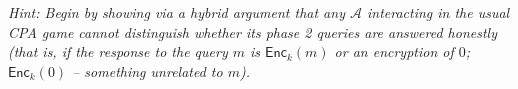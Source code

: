 \documentclass[11pt]{article}
\newcommand{\Enc}{\mathsf{Enc}}
\newcommand{\A}{\mathcal{A}}
\begin{document}
\noindent\textit{Hint: Begin by showing via a hybrid argument that any $\A$ interacting in the usual CPA game cannot distinguish whether its phase 2 queries are answered honestly (that is, if the response to the query $m$ is $\Enc_k(m)$ or an encryption of $0$; $\Enc_k(0)$ -- something unrelated to $m$).}
\\
\end{document}
